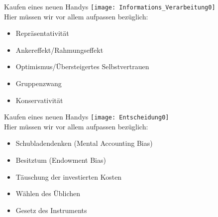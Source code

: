\begin{frame}[c]{Kaufen eines neuen Handys}
    \texttt{[image: Informations\_Verarbeitung0]} \\
    Hier müssen wir vor allem aufpassen bezüglich:
    \begin{itemize}[<+(1)->]
        \item Repräsentativität
        \item Ankereffekt/Rahmungseffekt
        \item Optimismus/Übersteigertes Selbstvertrauen
        \item Gruppenzwang
        \item Konservativität
    \end{itemize}
\end{frame}


\begin{frame}[c]{Kaufen eines neuen Handys}
    \texttt{[image: Entscheidung0]} \\
    Hier müssen wir vor allem aufpassen bezüglich:
    \begin{itemize}[<+(1)->]
        \item Schubladendenken (Mental Accounting Bias)
        \item Besitztum (Endowment Bias)
        \item Täuschung der investierten Kosten
        \item Wählen des Üblichen
        \item Gesetz des Instruments
    \end{itemize}
\end{frame}


